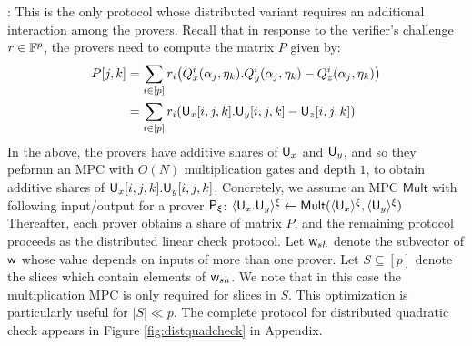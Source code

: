 : This is the only protocol whose distributed variant requires an additional interaction among the provers. Recall that in response to the verifier’s challenge $r\in \mathbb{F}^p$, the provers need to compute the matrix $P$ given by:
\begin{align*}
P[j,k] & =\sum_{i\in
[p]}r_i\big(Q_x^i(\alpha_j,\eta_k).Q_y^i(\alpha_j,\eta_k)-Q_z^i(\alpha_j,\eta_k)\big)\\    
& = \sum_{i\in [p]}r_i(\mathsf{U}_x[i,j,k].\mathsf{U}_y[i,j,k] - \mathsf{U}_z[i,j,k])
\end{align*}    
In the above, the provers have additive shares of $\mathsf{U}_x$ and
$\mathsf{U}_y$, and so they peformn an MPC with $O(N)$ multiplication gates and
depth $1$, to obtain additive shares of $\mathsf{U}_x[i,j,k].\mathsf{U}_y[i,j,k]$.
Concretely, we assume an MPC $\mathsf{Mult}$ with following input/output for
a prover $\mathsf{P}_\xi$:     
$\langle{\mathsf{U}_x.\mathsf{U}_y}\rangle^\xi\leftarrow \mathsf{Mult}(\langle{\mathsf{U}_x}\rangle^\xi,\langle{\mathsf{U}_y}\rangle^\xi)$    
Thereafter, each prover obtains a share of matrix $P$, and the remaining protocol proceeds as
the distributed linear check protocol. Let $\mathsf{w}_{sh}$ denote the subvector of
$\mathsf{w}$ whose value depends on inputs of more than one prover. Let $S\subseteq
[p]$ denote the slices which contain elements of $\mathsf{w}_{sh}$. We note that in
this case the multiplication MPC is only required for slices in $S$. This
optimization is particularly useful for $|S|\ll p$. 
The complete protocol for
distributed quadratic check appears in Figure \ref{fig:distquadcheck} in
Appendix.
